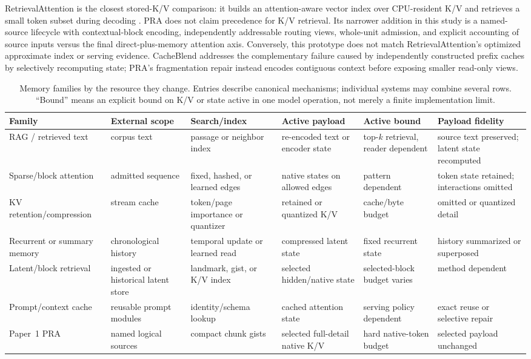 \documentclass[11pt]{article}
\begin{document}
RetrievalAttention is the closest stored-K/V comparison:
it builds an attention-aware vector index over CPU-resident K/V and retrieves a small
token subset during decoding
\cite{liu2024retrievalattention}. PRA does not claim precedence for K/V retrieval.
Its narrower
addition in this study is a named-source lifecycle with contextual-block encoding,
independently addressable routing views, whole-unit admission,
and explicit accounting of source inputs versus the final direct-plus-memory attention
axis. Conversely, this prototype does not match RetrievalAttention's optimized
approximate index or serving evidence. CacheBlend addresses the complementary failure
caused by independently constructed prefix caches by selectively recomputing state;
PRA's fragmentation repair instead encodes contiguous context before exposing smaller
read-only views.

\begin{table}[H]
\centering
\scriptsize
\setlength{\tabcolsep}{3pt}
\renewcommand{\arraystretch}{1.03}
\caption{Memory families by the resource they change.
Entries describe canonical mechanisms;
individual systems may combine several rows. ``Bound'' means an explicit bound on K/V or
state
active in one model operation, not merely a finite implementation limit.}
\label{tab:related-resource-taxonomy}
\begin{tabularx}{\textwidth}{P{0.14\textwidth}P{0.14\textwidth}P{0.14\textwidth}P{0.16\textwidth}P{0.11\textwidth}Y}
\toprule
Family &
  External scope &
  Search/index &
  Active payload &
  Active bound &
  Payload fidelity \\
\midrule
RAG / retrieved text &
  corpus text &
  passage or neighbor index &
  re-encoded text or encoder state &
  top-$k$ retrieval, reader dependent &
  source text preserved; latent state recomputed \\
Sparse/block attention &
  admitted sequence &
  fixed, hashed, or learned edges &
  native states on allowed edges &
  pattern dependent &
  token state retained; interactions omitted \\
KV retention/compression &
  stream cache &
  token/page importance or quantizer &
  retained or quantized K/V &
  cache/byte budget &
  omitted or quantized detail \\
Recurrent or summary memory &
  chronological history &
  temporal update or learned read &
  compressed latent state &
  fixed recurrent state &
  history summarized or superposed \\
Latent/block retrieval &
  ingested or historical latent store &
  landmark, gist, or K/V index &
  selected hidden/native state &
  selected-block budget varies &
  method dependent \\
Prompt/context cache &
  reusable prompt modules &
  identity/schema lookup &
  cached attention state &
  serving policy dependent &
  exact reuse or selective repair \\
Paper~1 PRA &
  named logical sources &
  compact chunk gists &
  selected full-detail native K/V &
  hard native-token budget &
  selected payload unchanged \\
\bottomrule
\end{tabularx}
\end{table}
\end{document}
